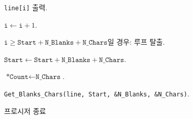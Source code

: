 \begin{algorithm}
\begin{algorithm}
\begin{algorithm}
\begin{algorithm}
\begin{algorithm}
										\item \texttt{line[i]} 출력.
										\item $\texttt{i} \leftarrow \texttt{i} + 1$.
										\item $\texttt{i} \geq \texttt{Start} + \texttt{N_Blanks} + \texttt{N_Chars}$일 경우: 루프 탈출.
									\end{algorithm}
								\item $\texttt{Start} \leftarrow \texttt{Start} + \texttt{N_Blanks} + \texttt{N_Chars}$.
								\item $\texttt{*Count} \leftarrow \texttt{N_Chars}$.
								\item \texttt{Get_Blanks_Chars(line, Start, \&N_Blanks, \&N_Chars)}.
							\end{algorithm}
 					\end{algorithm}
			\end{algorithm} 
	\item 프로시저 종료
\end{algorithm}



